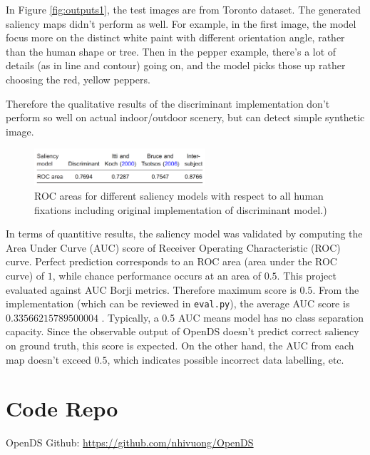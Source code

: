 \documentclass[conference]{IEEEtran}
\begin{document}
In Figure \ref{fig:outputs1}, the test images are from Toronto dataset. The generated saliency maps didn't perform as well. For example, in the first image, the model focus more on the distinct white paint with different orientation angle, rather than the human shape or tree. Then in the pepper example, there's a lot of details (as in line and contour) going on, and the model picks those up rather choosing the red, yellow peppers.

Therefore the qualitative results of the discriminant implementation don't perform so well on actual indoor/outdoor scenery, but can detect simple synthetic image. 

\begin{figure}[h]
    \centering
    \includegraphics[width=2.5in]{score.png}
    \caption{ROC areas for different saliency models with respect to all human fixations including original implementation of discriminant model.) }
    \label{fig:ROCscore}
\end{figure}

In terms of quantitive results, the saliency model was validated by computing the Area Under Curve (AUC) score of Receiver Operating Characteristic (ROC) curve. Perfect prediction corresponds to an ROC area (area under the ROC curve) of $1$, while chance performance occurs at an area of $0.5$. This project evaluated against AUC Borji metrics. Therefore maximum score is $0.5$. From the implementation (which can be reviewed in \texttt{eval.py}), the average AUC score is $0.33566215789500004$ . Typically, a 0.5 AUC means model has no class separation capacity. Since the observable output of OpenDS doesn't predict correct saliency on ground truth, this score is expected. On the other hand, the AUC from each map doesn't exceed $0.5$, which indicates possible incorrect data labelling, etc. 

\section{Code Repo}
OpenDS Github: \url{https://github.com/nhivuong/OpenDS}



\end{document}

